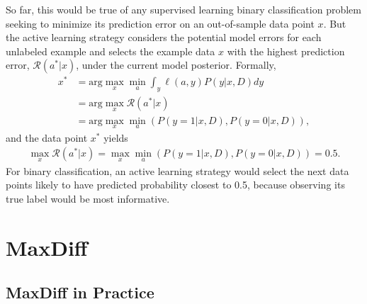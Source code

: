 \documentclass[nonblindrev]{informs3}
\newcommand{\risk}{\mathcal{R}}
\begin{document}
\begin{APPENDICES}
So far, this would be true of any supervised learning binary classification problem seeking to minimize its prediction error on an out-of-sample data point $x$. But the active learning strategy considers the potential model errors for each unlabeled example and selects the example data $x$ with the highest prediction error, $\risk(a^{*}|x)$, under the current model posterior. Formally,
\begin{align}
x^{*}  &= \text{arg} \max_{x} \min_{a} \int_y \ell(a,y) P(y|x,D) dy \\
&= \text{arg} \max_{x} \risk(a^{*}|x) \\
& =  \text{arg} \max_{x} \min_{a} \left( P(y=1|x,D), P(y=0|x,D) \right),
\end{align}
and the data point $x^{*}$ yields
\begin{align}
\max_{x} \risk(a^{*}|x) = \max_{x} \min_{a} \left( P(y=1|x,D), P(y=0|x,D) \right) = 0.5 .
\end{align}
For binary classification, an active learning strategy would select the next data points likely to have predicted probability closest to 0.5, because observing its true label would be most informative.







\section{MaxDiff} 

\subsection{MaxDiff in Practice}


\end{APPENDICES}
\end{document}
